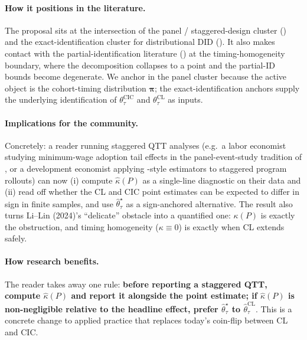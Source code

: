 \documentclass[11pt]{article}
\theoremstyle{definition}
\theoremstyle{plain}
\theoremstyle{remark}
\begin{document}
\paragraph{How it positions in the literature.} The proposal sits at the intersection of the panel / staggered-design cluster (\citet{GoodmanBacon2021,SunAbraham2021,CallawaySantAnna2021,BorusyakJaravelSpiess2024}) and the exact-identification cluster for distributional DID (\citet{AtheyImbens2006,CallawayLi2019,CallawayLiOka2018,Ciaccio2025,ChernozhukovFernandezValLuo2024}). It also makes contact with the partial-identification literature (\citet{FanYu2012}) at the timing-homogeneity boundary, where the decomposition collapses to a point and the partial-ID bounds become degenerate. We anchor in the panel cluster because the active object is the cohort-timing distribution $\boldsymbol\pi$; the exact-identification anchors supply the underlying identification of $\theta^{\mathrm{CIC}}_\tau$ and $\theta^{\mathrm{CL}}_\tau$ as inputs.

\paragraph{Implications for the community.} Concretely: a reader running staggered QTT analyses (e.g.\ a labor economist studying minimum-wage adoption tail effects in the panel-event-study tradition of \citet{CengizDubeLindnerZipperer2019}, or a development economist applying \citet{CallawayLi2019}-style estimators to staggered program rollouts) can now (i) compute $\widehat\kappa(P)$ as a single-line diagnostic on their data and (ii) read off whether the CL and CIC point estimates can be expected to differ in sign in finite samples, and use $\widehat\theta^\star_\tau$ as a sign-anchored alternative. The result also turns Li--Lin (2024)'s ``delicate'' obstacle into a quantified one: $\kappa(P)$ is exactly the obstruction, and timing homogeneity ($\kappa \equiv 0$) is exactly when CL extends safely.

\paragraph{How research benefits.} The reader takes away one rule: \textbf{before reporting a staggered QTT, compute $\widehat\kappa(P)$ and report it alongside the point estimate; if $\widehat\kappa(P)$ is non-negligible relative to the headline effect, prefer $\widehat\theta^\star_\tau$ to $\widehat\theta^{\mathrm{CL}}_\tau$}. This is a concrete change to applied practice that replaces today's coin-flip between CL and CIC.
\end{document}
